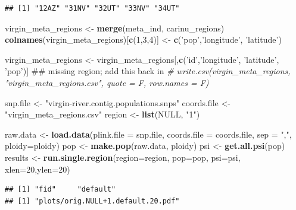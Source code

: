 \documentclass[]{article}
\newenvironment{Shaded}{\begin{snugshade}}{\end{snugshade}}
\newcommand{\KeywordTok}[1]{\textcolor[rgb]{0.13,0.29,0.53}{\textbf{#1}}}
\newcommand{\DataTypeTok}[1]{\textcolor[rgb]{0.13,0.29,0.53}{#1}}
\newcommand{\DecValTok}[1]{\textcolor[rgb]{0.00,0.00,0.81}{#1}}
\newcommand{\StringTok}[1]{\textcolor[rgb]{0.31,0.60,0.02}{#1}}
\newcommand{\CommentTok}[1]{\textcolor[rgb]{0.56,0.35,0.01}{\textit{#1}}}
\newcommand{\OtherTok}[1]{\textcolor[rgb]{0.56,0.35,0.01}{#1}}
\newcommand{\NormalTok}[1]{#1}
\begin{document}
\begin{verbatim}
## [1] "12AZ" "31NV" "32UT" "33NV" "34UT"
\end{verbatim}

\begin{Shaded}
\begin{Highlighting}[]
\NormalTok{virgin_meta_regions <-}\StringTok{ }\KeywordTok{merge}\NormalTok{(meta_ind, carinu_regions)}
\KeywordTok{colnames}\NormalTok{(virgin_meta_regions)[}\KeywordTok{c}\NormalTok{(}\DecValTok{1}\NormalTok{,}\DecValTok{3}\NormalTok{,}\DecValTok{4}\NormalTok{)] <-}\StringTok{ }\KeywordTok{c}\NormalTok{(}\StringTok{'pop'}\NormalTok{,}\StringTok{'longitude'}\NormalTok{, }\StringTok{'latitude'}\NormalTok{)}

\NormalTok{virgin_meta_regions <-}\StringTok{ }\NormalTok{virgin_meta_regions[,}\KeywordTok{c}\NormalTok{(}\StringTok{'id'}\NormalTok{,}\StringTok{'longitude'}\NormalTok{, }\StringTok{'latitude'}\NormalTok{, }\StringTok{'pop'}\NormalTok{)]}
\NormalTok{## missing region; add this back in }
\CommentTok{# write.csv(virgin_meta_regions, "virgin_meta_regions.csv", quote = F, row.names = F)}
\end{Highlighting}
\end{Shaded}

\begin{Shaded}
\begin{Highlighting}[]
\NormalTok{snp.file <-}\StringTok{ "virgin-river.contig.populations.snps"}
\NormalTok{coords.file <-}\StringTok{ "virgin_meta_regions.csv"}
\NormalTok{region <-}\StringTok{ }\KeywordTok{list}\NormalTok{(}\OtherTok{NULL}\NormalTok{, }\StringTok{"1"}\NormalTok{)}


\NormalTok{raw.data <-}\StringTok{ }\KeywordTok{load.data}\NormalTok{(}\DataTypeTok{plink.file =}\NormalTok{ snp.file, }\DataTypeTok{coords.file =}\NormalTok{ coords.file, }\DataTypeTok{sep =} \StringTok{","}\NormalTok{, }\DataTypeTok{ploidy=}\NormalTok{ploidy)}
\NormalTok{pop <-}\StringTok{ }\KeywordTok{make.pop}\NormalTok{(raw.data, ploidy)}
\NormalTok{psi <-}\StringTok{ }\KeywordTok{get.all.psi}\NormalTok{(pop)}
\NormalTok{results <-}\StringTok{ }\KeywordTok{run.single.region}\NormalTok{(}\DataTypeTok{region=}\NormalTok{region, }\DataTypeTok{pop=}\NormalTok{pop, }\DataTypeTok{psi=}\NormalTok{psi, }\DataTypeTok{xlen=}\DecValTok{20}\NormalTok{,}\DataTypeTok{ylen=}\DecValTok{20}\NormalTok{)}
\end{Highlighting}
\end{Shaded}

\begin{verbatim}
## [1] "fid"     "default"
## [1] "plots/orig.NULL+1.default.20.pdf"
\end{verbatim}
\end{document}
